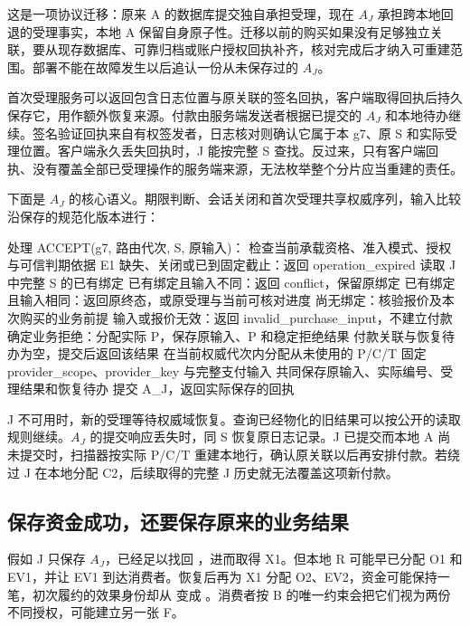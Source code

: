
这是一项协议迁移：原来 A 的数据库提交独自承担受理，现在 $A_J$ 承担跨本地回退的受理事实，本地 A 保留自身原子性。迁移以前的购买如果没有足够独立关联，要从现存数据库、可靠归档或账户授权回执补齐，核对完成后才纳入可重建范围。部署不能在故障发生以后追认一份从未保存过的 $A_J$。

首次受理服务可以返回包含日志位置与原关联的签名回执，客户端取得回执后持久保存它，用作额外恢复来源。付款由服务端发送者根据已提交的 $A_J$ 和本地待办继续。签名验证回执来自有权签发者，日志核对则确认它属于本 g7、原 S 和实际受理位置。客户端永久丢失回执时，J 能按完整 S 查找。反过来，只有客户端回执、没有覆盖全部已受理操作的服务端来源，无法枚举整个分片应当重建的责任。

下面是 $A_J$ 的核心语义。期限判断、会话关闭和首次受理共享权威序列，输入比较沿保存的规范化版本进行：

\begin{BookCode}
处理 ACCEPT(g7, 路由代次, S, 原输入)：
    检查当前承载资格、准入模式、授权与可信判期依据
    E1 缺失、关闭或已到固定截止：返回 operation_expired
    读取 J 中完整 S 的已有绑定
    已有绑定且输入不同：返回 conflict，保留原绑定
    已有绑定且输入相同：返回原终态，或原受理与当前可核对进度
    尚无绑定：核验报价及本次购买的业务前提
    输入或报价无效：返回 invalid_purchase_input，不建立付款
    确定业务拒绝：分配实际 P，保存原输入、P 和稳定拒绝结果
        付款关联与恢复待办为空，提交后返回该结果
    在当前权威代次内分配从未使用的 P/C/T
    固定 provider_scope、provider_key 与完整支付输入
    共同保存原输入、实际编号、受理结果和恢复待办
    提交 A_J，返回实际保存的回执
\end{BookCode}

J 不可用时，新的受理等待权威域恢复。查询已经物化的旧结果可以按公开的读取规则继续。$A_J$ 的提交响应丢失时，同 S 恢复原日志记录。J 已提交而本地 A 尚未提交时，扫描器按实际 P/C/T 重建本地行，确认原关联以后再安排付款。若绕过 J 在本地分配 C2，后续取得的完整 J 历史就无法覆盖这项新付款。

\subsection*{保存资金成功，还要保存原来的业务结果}

假如 J 只保存 $A_J$，已经足以找回 ，进而取得 X1。但本地 R 可能早已分配 O1 和 EV1，并让 EV1 到达消费者。恢复后再为 X1 分配 O2、EV2，资金可能保持一笔，初次履约的效果身份却从  变成 。消费者按 B 的唯一约束会把它们视为两份不同授权，可能建立另一张 F。


